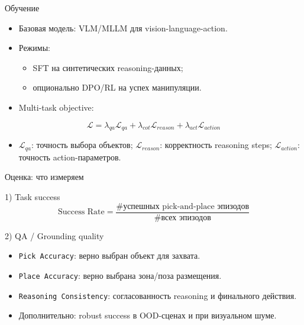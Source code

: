 \documentclass[aspectratio=169]{beamer}
\begin{document}
\begin{frame}{Обучение}
\begin{itemize}
    \item Базовая модель: VLM/MLLM для vision-language-action.
    \item Режимы:
    \begin{itemize}
        \item SFT на синтетических reasoning-данных;
        \item опционально DPO/RL на успех манипуляции.
    \end{itemize}
    \item Multi-task objective:
\end{itemize}
\[
\mathcal{L} = \lambda_{qa}\mathcal{L}_{qa} + \lambda_{cot}\mathcal{L}_{reason} + \lambda_{act}\mathcal{L}_{action}
\]
\begin{itemize}
    \item \(\mathcal{L}_{qa}\): точность выбора объектов; \(\mathcal{L}_{reason}\): корректность reasoning steps; \(\mathcal{L}_{action}\): точность action-параметров.
\end{itemize}
\end{frame}

\begin{frame}{Оценка: что измеряем}
\begin{block}{1) Task success}
\[
\text{Success Rate} = \frac{\#\text{успешных pick-and-place эпизодов}}{\#\text{всех эпизодов}}
\]
\end{block}

\begin{block}{2) QA / Grounding quality}
\begin{itemize}
    \item \texttt{Pick Accuracy}: верно выбран объект для захвата.
    \item \texttt{Place Accuracy}: верно выбрана зона/поза размещения.
    \item \texttt{Reasoning Consistency}: согласованность reasoning и финального действия.
\end{itemize}
\end{block}

\begin{itemize}
    \item Дополнительно: robust success в OOD-сценах и при визуальном шуме.
\end{itemize}
\end{frame}
\end{document}
